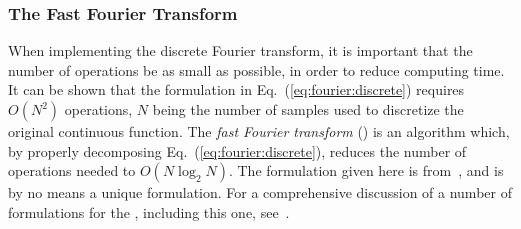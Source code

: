\subsubsection{The Fast Fourier Transform}

When implementing the discrete Fourier transform, it is important that
the number of operations be as small as possible, in order to reduce
computing time.  It can be shown that the formulation in
Eq.~(\ref{eq:fourier:discrete}) requires $O(N^{2})$ operations, $N$
being the number of samples used to discretize the original continuous
function.  The {\em fast Fourier transform\/} ({\fft}) is an algorithm
which, by properly decomposing Eq.~(\ref{eq:fourier:discrete}),
reduces the number of operations needed to $O(N\log_{2}N)$.  The
formulation given here is from~\cite{digim}, and is by no means a
unique formulation.  For a comprehensive discussion of a number of
formulations for the {\fft}, including this one, see~\cite{brigham}.

